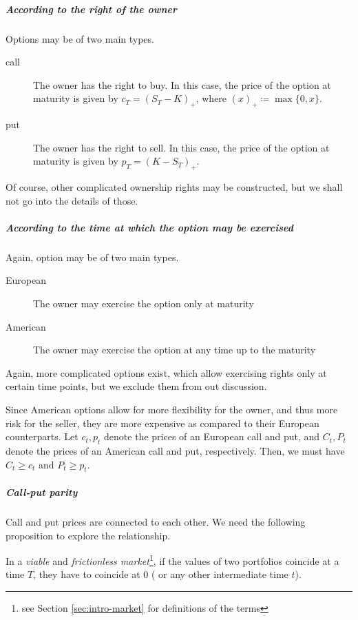 \subparagraph{According to the right of the owner}  Options may be of two main types.
\begin{description}
	\item[call] The owner has the right to buy. In this case, the price of the option at maturity is given by $ c_T = (S_T - K)_+ $, where $ (x)_+ \coloneqq \max \{ 0, x \} $.
	\item[put] The owner has the right to sell. In this case, the price of the option at maturity is given by $ p_T = (K - S_T)_+ $.
\end{description}
Of course, other complicated ownership rights may be constructed, but we shall not go into the details of those.

\subparagraph{According to the time at which the option may be exercised}  Again, option may be of two main types.
\begin{description}
	\item[European] The owner may exercise the option only at maturity
	\item[American] The owner may exercise the option at any time up to the maturity
\end{description}
Again, more complicated options exist, which allow exercising rights only at certain time points, but we exclude them from out discussion.

Since American options allow for more flexibility for the owner, and thus more risk for the seller, they are more expensive as compared to their European counterparts. Let $ c_t, p_t $ denote the prices of an European call and put, and $ C_t, P_t $ denote the prices of an American call and put, respectively. Then, we must have $ C_t \ge c_t $ and $ P_t \ge p_t $.


\subparagraph{Call-put parity}  Call and put prices are connected to each other. We need the following proposition to explore the relationship.

\begin{prp}
	\label{thm:intro-portfolio-eq}
	In a \emph{viable} and \emph{frictionless market}\footnote{see Section \ref{sec:intro-market} for definitions of the terms}, if the values of two portfolios coincide at a time $ T $, they have to coincide at $ 0 $ ( or any other intermediate time $ t $).
\end{prp}

